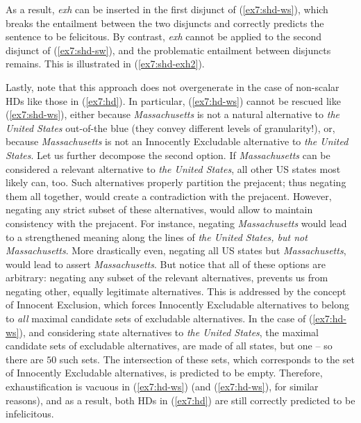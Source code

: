 As a result, \textit{exh} can be inserted in the first disjunct of (\ref{ex7:shd-ws}), which breaks the entailment between the two disjuncts and correctly predicts the sentence to be felicitous. By contrast, \textit{exh} cannot be applied to the second disjunct of (\ref{ex7:shd-sw}), and the problematic entailment between disjuncts remains. This is illustrated in (\ref{ex7:shd-exh2}).


\begin{exe}
	\ex\label{ex7:shd-exh2}
	\begin{xlist}
		\label{ex7:shd-ws-exh2}
		\label{ex7:shd-sw-exh2}
	\end{xlist}
\end{exe}


Lastly, note that this approach does not overgenerate in the case of non-scalar HDs like those in (\ref{ex7:hd}). In particular, (\ref{ex7:hd-ws}) cannot be rescued like (\ref{ex7:shd-ws}), either because \textit{Massachusetts} is not a natural alternative to \textit{the United States} out-of-the blue (they convey different levels of granularity!), or, because \textit{Massachusetts} is not an Innocently Excludable alternative to \textit{the United States}. Let us further decompose the second option. If \textit{Massachusetts} can be considered a relevant alternative to \textit{the United States}, all other US states most likely can, too. Such alternatives properly partition the prejacent; thus negating them all together, would create a contradiction with the prejacent. However, negating any strict subset of these alternatives, would allow to maintain consistency with the prejacent. For instance, negating \textit{Massachusetts} would lead to a strengthened meaning along the lines of \textit{the United States, but not Massachusetts}. More drastically even, negating all US states but \textit{Massachusetts}, would lead to assert \textit{Massachusetts}. But notice that all of these options are arbitrary: negating any subset of the relevant alternatives, prevents us from negating other, equally legitimate alternatives. This is addressed by the concept of Innocent Exclusion, which forces Innocently Excludable alternatives to belong to \textit{all} maximal candidate sets of excludable alternatives. In the case of (\ref{ex7:hd-ws}), and considering state alternatives to \textit{the United States}, the maximal candidate sets of excludable alternatives, are made of all states, but one -- so there are $50$ such sets. The intersection of these sets, which corresponds to the set of Innocently Excludable alternatives, is predicted to be empty. Therefore, exhaustification is vacuous in (\ref{ex7:hd-ws}) (and (\ref{ex7:hd-ws}), for similar reasons), and as a result, both HDs in (\ref{ex7:hd}) are still correctly predicted to be infelicitous.\\

